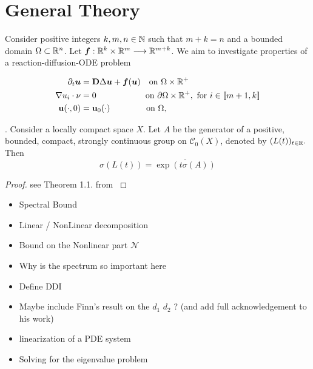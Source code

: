 \section{General Theory}

Consider positive integers $k, m, n \in \mathbb{N}$ such that $m+k = n$ and a bounded domain $\Omega \subset \mathbb{R}^{n}$. Let $\bm f : \mathbb{R}^k \times \mathbb{R}^m \longrightarrow \mathbb{R}^{m+k}$. We aim to investigate properties of a reaction-diffusion-ODE problem
 
\begin{align}
	\partial_t\bm{u}  &= \bm{\mathrm D} \Delta \bm{u} + \bm{f}(\bm{u}) \quad \text{on } \Omega \times \mathbb R^{+} \notag \\  \nabla u_i \cdot \nu &= 0 \qquad\qquad\qquad\! \text{on } \partial\Omega \times \mathbb R^{+}, \text{ for } i \in [\![ m+1, k ]\!]\\
	\mathbf{u}(\cdot, 0) &= \mathbf{u}_0(\cdot) \qquad\qquad\; \text{on } \Omega, \notag
\end{align}


\begin{theorem} 
	. Consider a locally compact space $X$. Let $A$ be the generator of a positive, bounded, compact, strongly continuous group on $\mathcal C_0(X)$, denoted by $(L(t))_{t\in\mathbb{R}}.$ Then
	$$\sigma(L(t)) = \overline{\exp(t \sigma(A))}$$
\end{theorem}

\begin{proof}
	see Theorem 1.1. from \cite{Arendt1984}
\end{proof}



\begin{itemize}
    \item Spectral Bound
    \item Linear / NonLinear decomposition
    \item Bound on the Nonlinear part $\mathcal N$
    
    \item Why is the spectrum so important here
    \item Define DDI
    \item Maybe include Finn's result on the $d_1$ $d_2$ ? (and add full acknowledgement to his work)
    \item linearization of a PDE system
    \item Solving for the eigenvalue problem   
\end{itemize}